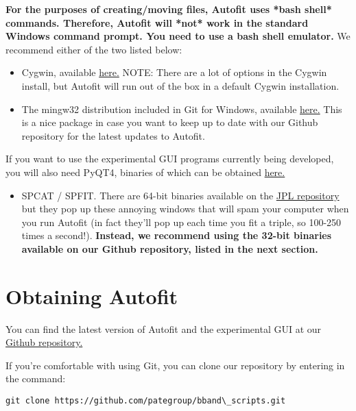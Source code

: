 \documentclass[letterpaper,10pt,english]{sphinxmanual}
\begin{document}
\textbf{For the purposes of creating/moving files, Autofit uses *bash shell* commands. Therefore, Autofit will *not* work in the standard Windows command prompt. You need to use a bash shell emulator.} We recommend either of the two listed below:
\begin{itemize}
\item {} 
Cygwin, available \href{http://www.cygwin.com/}{here.} NOTE: There are a lot of options in the Cygwin install, but Autofit will run out of the box in a default Cygwin installation.

\item {} 
The mingw32 distribution included in Git for Windows, available \href{http://git-scm.com/downloads}{here.} This is a nice package in case you want to keep up to date with our Github repository for the latest updates to Autofit.

\end{itemize}

If you want to use the experimental GUI programs currently being developed, you will also need PyQT4, binaries of which can be obtained \href{http://www.riverbankcomputing.com/software/pyqt/download}{here.}
\begin{itemize}
\item {} 
SPCAT / SPFIT. There are 64-bit binaries available on the \href{http://spec.jpl.nasa.gov/ftp/pub/calpgm/}{JPL repository} but they pop up these annoying windows that will spam your computer when you run Autofit (in fact they'll pop up each time you fit a triple, so 100-250 times a second!). \textbf{Instead, we recommend using the 32-bit binaries available on our Github repository, listed in the next section.}

\end{itemize}


\section{Obtaining Autofit}
\label{gettingstarted:obtaining-autofit}
You can find the latest version of Autofit and the experimental GUI at our \href{https://github.com/pategroup/bband\_scripts/tree/master/autofit}{Github repository.}

If you're comfortable with using Git, you can clone our repository by entering in the command:

\begin{Verbatim}[commandchars=\\\{\}]
git clone https://github.com/pategroup/bband\_scripts.git
\end{Verbatim}
\end{document}
